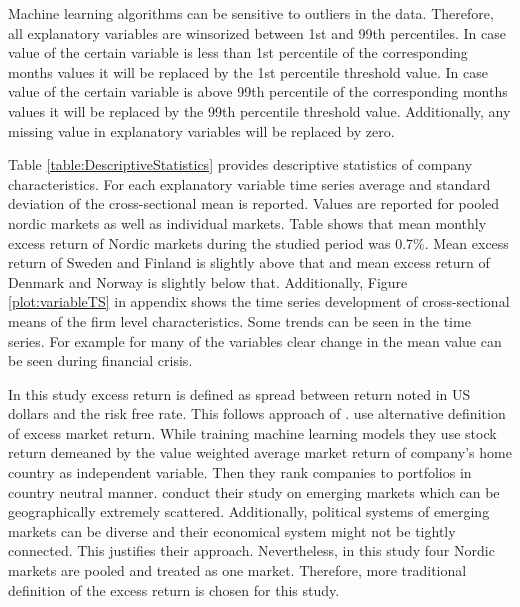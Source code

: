 \documentclass[12pt]{article}
\begin{document}
Machine learning algorithms can be sensitive to outliers in the data. Therefore, all explanatory variables are winsorized between 1st and 99th percentiles. In case value of the certain variable is less than 1st percentile of the corresponding months values it will be replaced by the 1st percentile threshold value. In case value of the certain variable is above 99th percentile of the corresponding months values it will be replaced by the 99th percentile threshold value. %
Additionally, any missing value in explanatory variables will be replaced by zero. \par

Table \ref{table:DescriptiveStatistics} provides descriptive statistics of company characteristics. For each explanatory variable time series average and standard deviation of the cross-sectional mean is reported. Values are reported for pooled nordic markets as well as individual markets. Table shows that mean monthly excess return of Nordic markets during the studied period was 0.7\%. Mean excess return of Sweden and Finland is slightly above that and mean excess return of Denmark and Norway is slightly below that. Additionally, Figure \ref{plot:variableTS} in appendix shows the time series development of cross-sectional means of the firm level characteristics. Some trends can be seen in the time series. For example for many of the variables clear change in the mean value can be seen during financial crisis. 

In this study excess return is defined as spread between return noted in US dollars and the risk free rate. This follows approach of \citet{guetal}. \citet{HANAUER2023} use alternative definition of excess market return. While training machine learning models they use stock return demeaned by the value weighted average market return of company's home country as independent variable. Then they rank companies to portfolios in country neutral manner. \citeauthor{HANAUER2023} conduct their study on emerging markets which can be geographically extremely scattered. Additionally, political systems of emerging markets can be diverse and their economical system might not be tightly connected. This justifies their approach. Nevertheless, in this study four Nordic markets are pooled and treated as one market. Therefore, more traditional definition of the excess return is chosen for this study. \par


\end{document}
